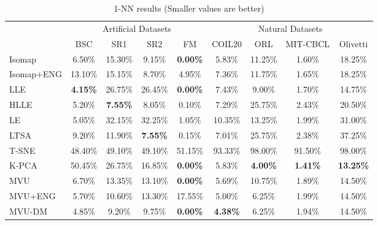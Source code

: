 \begin{table}[t]
\caption{1-NN results (Smaller values are better)}
\label{tab:1NN}
\begin{center}
\begin{tabular}{|l|c|c|c|c||c|c|c|c|}
\hline
\multicolumn{1}{|c|}{} & \multicolumn{4}{c||}{Artificial Datasets} & \multicolumn{4}{c|}{Natural Datasets} \\
                     & BSC & SR1 & SR2 & FM & COIL20 & ORL & MIT-CBCL & Olivetti \\
\hline
Isomap            & 6.50\% & 15.30\% & 9.15\% & \textbf{0.00\%} & 5.83\% & 11.25\% & 1.60\% & 18.25\% \\
Isomap+ENG            & 13.10\% & 15.15\% & 8.70\% & 4.95\% & 7.36\% & 11.75\% & 1.65\% & 18.25\% \\
LLE            & \textbf{4.15\%} & 26.75\% & 26.45\% & \textbf{0.00\%} & 7.43\% & 9.00\% & 1.70\% & 14.75\% \\
HLLE            & 5.20\% & \textbf{7.55\%} & 8.05\% & 0.10\% & 7.29\% & 25.75\% & 2.43\% & 20.50\% \\
LE            & 5.05\% & 32.15\% & 32.25\% & 1.05\% & 10.35\% & 13.25\% & 1.99\% & 31.00\% \\
LTSA            & 9.20\% & 11.90\% & \textbf{7.55\%} & 0.15\% & 7.01\% & 25.75\% & 2.38\% & 37.25\% \\
T-SNE            & 48.40\% & 49.10\% & 49.10\% & 51.15\% & 93.33\% & 98.00\% & 91.50\% & 98.00\% \\
K-PCA            & 50.45\% & 26.75\% & 16.85\% & \textbf{0.00\%} & 5.83\% & \textbf{4.00\%} & \textbf{1.41\%} & \textbf{13.25\%} \\
\hline
MVU            & 6.70\% & 13.35\% & 13.10\% & \textbf{0.00\%} & 5.69\% & 10.75\% & 1.89\% & 14.50\% \\
MVU+ENG            & 5.70\% & 10.60\% & 13.30\% & 17.55\% & 5.00\% & 6.25\% & 1.99\% & 14.50\% \\
MVU-DM            & 4.85\% & 9.20\% & 9.75\% & \textbf{0.00\%} & \textbf{4.38\%} & 6.25\% & 1.94\% & 14.50\% \\
\hline
\end{tabular}
\end{center}
\end{table}

